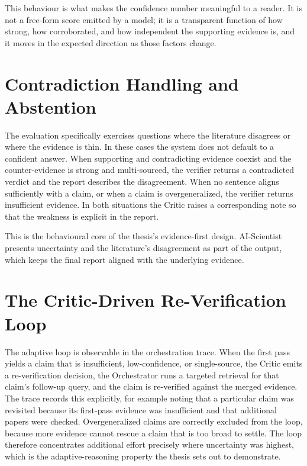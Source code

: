 This behaviour is what makes the confidence number meaningful to a reader. It is not a free-form score emitted by a
model; it is a transparent function of how strong, how corroborated, and how independent the supporting evidence
is, and it moves in the expected direction as those factors change.

\section{Contradiction Handling and Abstention }

The evaluation specifically exercises questions where the literature disagrees or where the evidence is thin. In
these cases the system does not default to a confident answer. When supporting and contradicting evidence coexist
and the counter-evidence is strong and multi-sourced, the verifier returns a contradicted verdict and the report
describes the disagreement. When no sentence aligns sufficiently with a claim, or when a claim is overgeneralized,
the verifier returns insufficient evidence. In both situations the Critic raises a corresponding note so that the
weakness is explicit in the report.

This is the behavioural core of the thesis's evidence-first design. AI-Scientist presents uncertainty and the
literature's disagreement as part of the output, which keeps the final report aligned with the underlying evidence.

\section{The Critic-Driven Re-Verification Loop }

The adaptive loop is observable in the orchestration trace. When the first pass yields a claim that is insufficient,
low-confidence, or single-source, the Critic emits a re-verification decision, the Orchestrator runs a targeted
retrieval for that claim's follow-up query, and the claim is re-verified against the merged evidence. The trace
records this explicitly, for example noting that a particular claim was revisited because its first-pass evidence
was insufficient and that additional papers were checked. Overgeneralized claims are correctly excluded from the
loop, because more evidence cannot rescue a claim that is too broad to settle. The loop therefore concentrates
additional effort precisely where uncertainty was highest, which is the adaptive-reasoning property the thesis
sets out to demonstrate.

